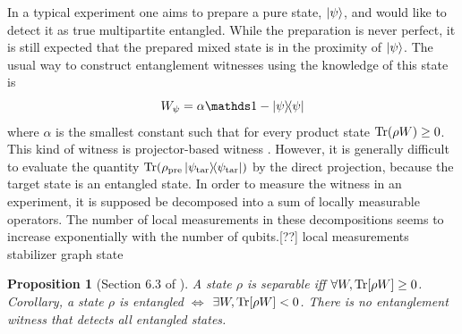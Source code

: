 \documentclass[
reprint,
aps,
pra,
floatfix,
]{revtex4-2}
\theoremstyle{plain}
\newtheorem{proposition}{Proposition}
\theoremstyle{definition}
\newtheorem{remark}{Remark}
\newcommand{\ew}{W}
\newcommand{\target}{\textup{tar}}
\newcommand{\prepare}{\textup{pre}}
\newcommand{\dm}{\rho}
\begin{document}
In a typical experiment one aims to prepare a pure state, $\ket{\psi}$, and would like to detect it as true multipartite entangled. 
While the preparation is never perfect, it is still expected that the prepared mixed state is in the proximity of $\ket{\psi}$. The usual way to construct entanglement witnesses using the knowledge of this state is
\begin{equation}
	\ew_{\psi} = \alpha\identity - \op{\psi} 
	\label{eq:entanglement_witness}
\end{equation}
where $\alpha$ is the smallest constant such that for every product state $\Tr(\dm\ew)\ge 0$.
This kind of witness is projector-based witness \cite{bourennaneWitnessingMultipartiteEntanglement2004}.
However, it is generally difficult to evaluate the quantity $\Tr(\dm_{\prepare} \op{\psi_{\target}})$ by the direct projection, because the target state is an entangled state.
In order to measure the witness in an experiment, it is supposed be decomposed into a sum of locally measurable operators. 
The number of local measurements in these decompositions seems to increase exponentially with the number of qubits.[??]
local measurements \cite{tothDetectingGenuineMultipartite2005}
stabilizer \cite{tothEntanglementDetectionStabilizer2005}
graph state \cite{zhouDetectingMultipartiteEntanglement2019}
\begin{proposition}[Section 6.3 of \cite{heinosaariMathematicalLanguageQuantum2011}]
	A state $\dm$ is separable iff $\forall \ew,\Tr[\dm \ew]\ge 0$. 
	Corollary, a state $\dm$ is entangled $\iff$  $\exists \ew,\Tr[\dm \ew]<0$. 
	There is no entanglement witness that detects all entangled states.
\end{proposition}
\end{document}
